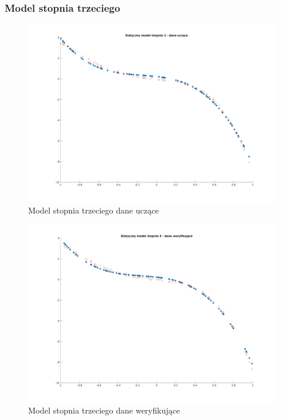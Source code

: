 \documentclass[a4paper, 11pt]{article}
\begin{document}
\subsubsection{Model stopnia trzeciego}
\begin{figure}[H]
\centering
\includegraphics[scale=0.50]{dane_stat_3_ucz.png}
\caption{Model stopnia trzeciego dane uczące}
\label{}
\end{figure}
\begin{figure}[H]
\centering
\includegraphics[scale=0.50]{dane_stat_3_wer.png}
\caption{Model stopnia trzeciego dane weryfikujące}
\label{}
\end{figure}
\end{document}
